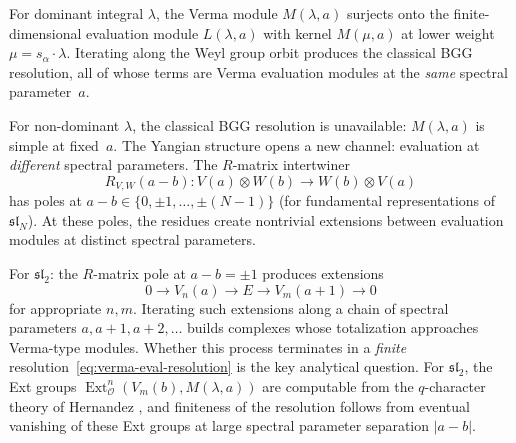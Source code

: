 \begin{remark}
\label{rem:bgg-spectral-parameter}
For dominant integral $\lambda$, the Verma module $M(\lambda, a)$
surjects onto the finite-dimensional evaluation module
$L(\lambda, a)$ with kernel $M(\mu, a)$ at lower weight
$\mu = s_\alpha \cdot \lambda$. Iterating along the Weyl group
orbit produces the classical BGG resolution, all of whose terms are
Verma evaluation modules at the \emph{same} spectral parameter~$a$.

For non-dominant $\lambda$, the classical BGG resolution is
unavailable: $M(\lambda, a)$ is simple at fixed~$a$. The Yangian
structure opens a new channel: evaluation at \emph{different}
spectral parameters. The $R$-matrix intertwiner
\[
R_{V,W}(a - b)\colon V(a) \otimes W(b) \to W(b) \otimes V(a)
\]
has poles at $a - b \in \{0, \pm 1, \ldots, \pm (N-1)\}$
(for fundamental representations of $\mathfrak{sl}_N$).
At these poles, the residues create nontrivial extensions between
evaluation modules at distinct spectral parameters.

For $\mathfrak{sl}_2$: the $R$-matrix pole at $a - b = \pm 1$
produces extensions
\[
0 \to V_n(a) \to E \to V_m(a+1) \to 0
\]
for appropriate $n, m$. Iterating such extensions along a chain
of spectral parameters $a, a+1, a+2, \ldots$ builds complexes
whose totalization approaches Verma-type modules. Whether this
process terminates in a \emph{finite}
resolution~\eqref{eq:verma-eval-resolution} is the key analytical
question. For $\mathfrak{sl}_2$, the Ext groups
$\operatorname{Ext}^n_{\mathcal{O}}(V_m(b), M(\lambda, a))$ are
computable from the $q$-character theory of Hernandez
\cite{Hernandez05}, and finiteness of the resolution follows
from eventual vanishing of these Ext groups at large spectral
parameter separation $|a - b|$.
\end{remark}

